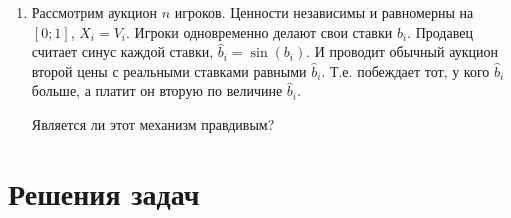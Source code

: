 \begin{enumerate}
\item Рассмотрим аукцион $ n $ игроков. Ценности независимы и равномерны на $ [0;1] $, $ X_{i}=V_{i} $. Игроки одновременно делают свои ставки $ b_{i} $. Продавец считает синус каждой ставки, $ \hat{b}_{i}=\sin (b_{i}) $. И проводит обычный аукцион второй цены с реальными ставками равными $\hat{b}_{i}  $. Т.е. побеждает тот, у кого $ \hat{b}_{i} $ больше, а платит он вторую по величине $ \hat{b}_{i} $. 

Является ли этот механизм правдивым?




\end{enumerate}








\section{Решения задач}
